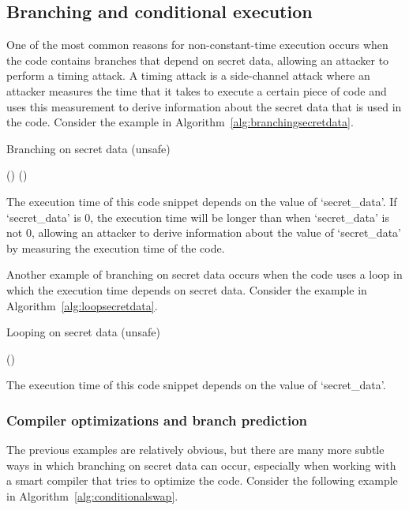 \documentclass[11pt,a4paper]{report}
\theoremstyle{definition}
\begin{document}
\subsection{Branching and conditional execution}
\label{sec:branching}
One of the most common reasons for non-constant-time execution occurs when the code contains branches that depend on secret data, allowing an attacker to perform a timing attack. A timing attack is a side-channel attack where an attacker measures the time that it takes to execute a certain piece of code and uses this measurement to derive information about the secret data that is used in the code. Consider the example in Algorithm~\ref{alg:branchingsecretdata}.

\begin{algorithm}
  \caption{Branching on secret data (unsafe)}
  \label{alg:branchingsecretdata}
  \begin{algorithmic}[1]
    \State {}() 
    \Else
    \State {}() 
    \EndIf
  \end{algorithmic}
\end{algorithm}

The execution time of this code snippet depends on the value of `secret\_data'. If `secret\_data' is 0, the execution time will be longer than when `secret\_data' is not 0, allowing an attacker to derive information about the value of `secret\_data' by measuring the execution time of the code.

Another example of branching on secret data occurs when the code uses a loop in which the execution time depends on secret data. Consider the example in Algorithm~\ref{alg:loopsecretdata}.

\begin{algorithm}
  \caption{Looping on secret data (unsafe)}
  \label{alg:loopsecretdata}
  \begin{algorithmic}[1]
    \State {}()
    \EndFor
  \end{algorithmic}
\end{algorithm}

The execution time of this code snippet depends on the value of `secret\_data'.

\subsubsection{Compiler optimizations and branch prediction}
The previous examples are relatively obvious, but there are many more subtle ways in which branching on secret data can occur, especially when working with a smart compiler that tries to optimize the code. Consider the following example in Algorithm~\ref{alg:conditionalswap}.
\end{document}
